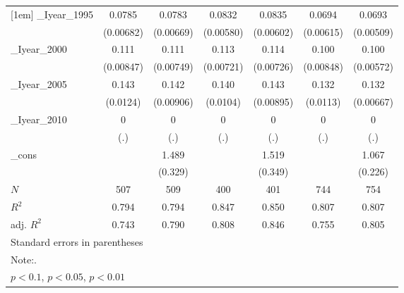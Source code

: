\begin{table}[htbp]
\begin{tabular}{l*{6}{c}}
[1em]
\_Iyear\_1995&   0.0785\sym{***}&   0.0783\sym{***}&   0.0832\sym{***}&   0.0835\sym{***}&   0.0694\sym{***}&   0.0693\sym{***}\\
          &(0.00682)         &(0.00669)         &(0.00580)         &(0.00602)         &(0.00615)         &(0.00509)         \\
[1em]
\_Iyear\_2000&    0.111\sym{***}&    0.111\sym{***}&    0.113\sym{***}&    0.114\sym{***}&    0.100\sym{***}&    0.100\sym{***}\\
          &(0.00847)         &(0.00749)         &(0.00721)         &(0.00726)         &(0.00848)         &(0.00572)         \\
[1em]
\_Iyear\_2005&    0.143\sym{***}&    0.142\sym{***}&    0.140\sym{***}&    0.143\sym{***}&    0.132\sym{***}&    0.132\sym{***}\\
          & (0.0124)         &(0.00906)         & (0.0104)         &(0.00895)         & (0.0113)         &(0.00667)         \\
[1em]
\_Iyear\_2010&        0         &        0         &        0         &        0         &        0         &        0         \\
          &      (.)         &      (.)         &      (.)         &      (.)         &      (.)         &      (.)         \\
[1em]
\_cons    &                  &    1.489\sym{***}&                  &    1.519\sym{***}&                  &    1.067\sym{***}\\
          &                  &  (0.329)         &                  &  (0.349)         &                  &  (0.226)         \\
\hline
\(N\)     &      507         &      509         &      400         &      401         &      744         &      754         \\
\(R^{2}\) &    0.794         &    0.794         &    0.847         &    0.850         &    0.807         &    0.807         \\
adj. \(R^{2}\)&    0.743         &    0.790         &    0.808         &    0.846         &    0.755         &    0.805         \\
\hline\hline
\multicolumn{7}{l}{\footnotesize Standard errors in parentheses}\\
\multicolumn{7}{l}{\footnotesize Note:.}\\
\multicolumn{7}{l}{\footnotesize \sym{*} \(p<0.1\), \sym{**} \(p<0.05\), \sym{***} \(p<0.01\)}\\
\end{tabular}
\end{table}
